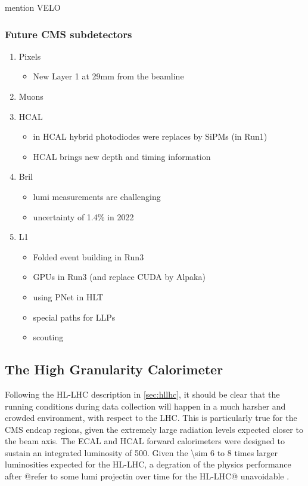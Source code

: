 \documentclass[11pt]{article}
\begin{document}
mention VELO

\cite{lhcb_hllhc_tdr,lhcb_hllhc_interest}
\subsubsection{Future CMS subdetectors}
\label{sec:orge1b0259}
\label{sec:hllhc_future_subdetectors.org}

\begin{enumerate}
\item Pixels
\label{sec:orgc445baa}
\begin{itemize}
\item New Layer 1 at 29mm from the beamline
\end{itemize}
\item Muons
\label{sec:orgd9afb69}
\item HCAL
\label{sec:org5c66ea2}
\begin{itemize}
\item in HCAL hybrid photodiodes were replaces by SiPMs (in Run1)
\item HCAL brings new depth and timing information
\end{itemize}
\item Bril
\label{sec:org7c8b0ff}
\begin{itemize}
\item lumi measurements are challenging
\item uncertainty of 1.4\% in 2022
\end{itemize}
\item L1
\label{sec:orgeacfbd5}
\begin{itemize}
\item Folded event building in Run3
\item GPUs in Run3 (and replace CUDA by Alpaka)
\item using PNet in HLT
\item special paths for LLPs
\item scouting
\end{itemize}
\end{enumerate}
\subsection{The High Granularity Calorimeter}
\label{sec:org03db42c}
\label{sec:hgcal_intro}

Following the \ac{HL-LHC} description in \cref{sec:hllhc}, it should be clear that the running conditions during data collection will happen in a much harsher and crowded environment, with respect to the \ac{LHC}.
This is particularly true for the \ac{CMS} endcap regions, given the extremely large radiation levels expected closer to the beam axis.
The \ac{ECAL} and \ac{HCAL} forward calorimeters were designed to sustain an integrated luminosity of \SI{500}{\invfb}.
Given the \num{\sim 6} to \num{8} times larger luminosities expected for the \ac{HL-LHC}, a degration of the physics performance after @refer to some lumi projectin over time for the HL-LHC@ unavoidable \cite{hgcal_technical_proposal}.
\end{document}
